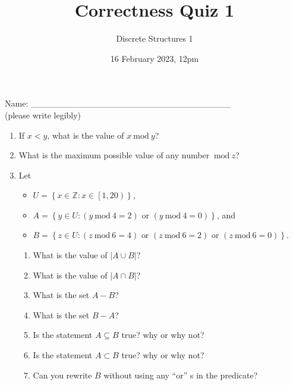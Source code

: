 \documentclass[11pt, oneside]{article}   	%
\title{Correctness Quiz 1}
\author{Discrete Structures 1}
\date{16 February 2023, 12pm}							%
\newcommand{\ints}{\mathbb{Z}}
\renewcommand{\mod}{\ \mathrm{mod}\ }
\begin{document}
\maketitle
\begin{center}
Name: \_\_\_\_\_\_\_\_\_\_\_\_\_\_\_\_\_\_\_\_\_\_\_\_\_\_\_\_\_\_\_\_ \\(please write legibly) 
\end{center}

\begin{enumerate}


\item
If $x < y$, what is the value of $x\mod y$?
\vspace{3em}

\item 
What is the maximum possible value of any number $\mod z$?
\vspace{3em}

\item Let 
\begin{itemize}
\item $U = \left\{x \in \ints : x \in \left[1,20\right)\right\}$, 
\item $A = \left\{y \in U: \left(y \mod 4 = 2\right) \text{ or } \left(y \mod 4 = 0\right)\right\}$, and
\item $B = \left\{z \in U : \left(z \mod 6 = 4\right) \text{ or } \left(z \mod 6 = 2\right) \text{ or } \left(z \mod 6 = 0\right)\right\}$.
\end{itemize}
\begin{enumerate}
\item What is the value of $\left|A \cup B\right|$?
\item What is the value of $\left|A \cap B\right|$?
\item What is the set $A - B$?
\item What is the set $B - A$?
\item Is the statement $A \subseteq B$ true? why or why not? 
\vspace{3em}
\item Is the statement $A \subset B$ true? why or why not? 
\vspace{3em}
\item Can you rewrite $B$ without using any ``or'' s in the predicate? 
\vspace{3em}
\end{enumerate}


\end{enumerate}
\end{document}

